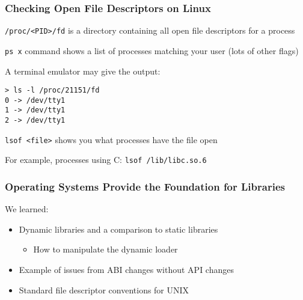   \begin{frame}[fragile]
    \frametitle{Checking Open File Descriptors on Linux}

    \texttt{/proc/<PID>/fd} \hspace{0.5em} is a directory containing all open
    file descriptors for a process

    \texttt{ps x} \hspace{0.5em} command shows a list of processes matching your
    user (lots of other flags)

    \vspace{1em}

    A terminal emulator may give the output:
    \begin{lstlisting}[basicstyle=\small\ttfamily]
> ls -l /proc/21151/fd
0 -> /dev/tty1
1 -> /dev/tty1
2 -> /dev/tty1
    \end{lstlisting}

    \vspace{2em}

    \texttt{lsof <file>} \hspace{0.5em} shows you what processes have the file
    open

    \hspace{2em} For example, processes using C: \hspace{0.5em}
    \texttt{lsof /lib/libc.so.6}
  \end{frame}

  \begin{frame}
    \frametitle{Operating Systems Provide the Foundation for Libraries}

    We learned:
    \begin{itemize}
      \item Dynamic libraries and a comparison to static libraries
      \begin{itemize}
        \item How to manipulate the dynamic loader
      \end{itemize}
      \item Example of issues from ABI changes without API changes
      \item Standard file descriptor conventions for UNIX
    \end{itemize}
  \end{frame}

